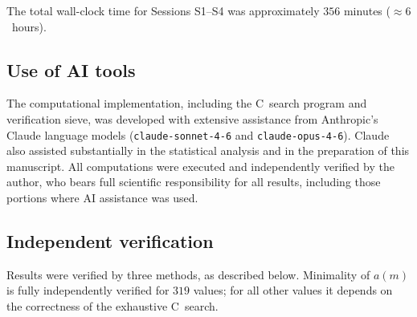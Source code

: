 \documentclass[pdflatex,sn-mathphys-num,Numbered]{sn-jnl}
\theoremstyle{thmstyleone}
\theoremstyle{thmstylethree}
\theoremstyle{thmstyletwo}
\numberwithin{equation}{section}
\begin{document}
The total wall-clock time for Sessions S1--S4 was approximately
$356$ minutes ($\approx 6$~hours).

\subsection{Use of AI tools}
\label{sec:ai-disclosure}

The computational implementation, including the C~search program
and verification sieve, was developed with extensive assistance
from Anthropic's Claude language models
(\texttt{claude-sonnet-4-6} and \texttt{claude-opus-4-6}).
Claude also assisted substantially in the statistical analysis
and in the preparation of this manuscript.
All computations were executed and independently verified by the
author, who bears full scientific responsibility for all results,
including those portions where AI assistance was used.

\subsection{Independent verification}
\label{sec:verification}

Results were verified by three methods, as described below.
Minimality of $a(m)$ is fully independently verified for $319$
values; for all other values it depends on the correctness of the
exhaustive C~search.
\end{document}
